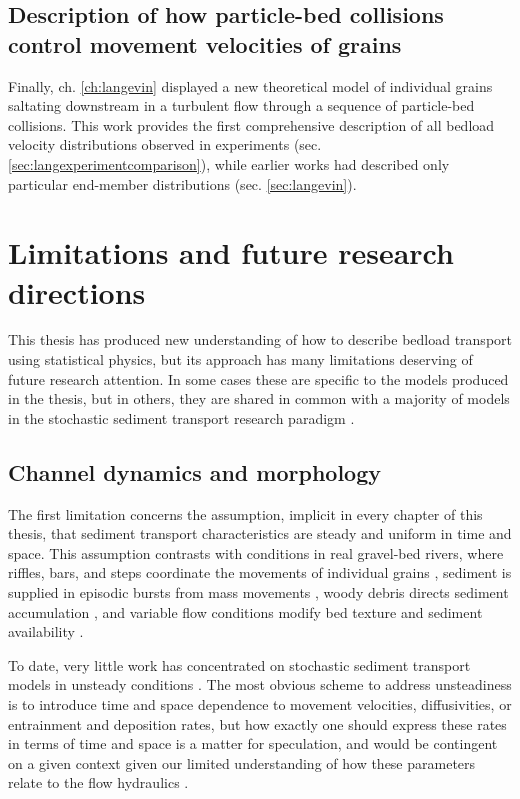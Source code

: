 \subsection{Description of how particle-bed collisions control movement velocities of grains}

Finally, ch. \ref{ch:langevin} displayed a new theoretical model of individual grains saltating downstream in a turbulent flow through a sequence of particle-bed collisions.
This work provides the first comprehensive description of all bedload velocity distributions observed in experiments (sec. \ref{sec:langexperimentcomparison}), while earlier works had described only particular end-member distributions (sec. \ref{sec:langevin}).

\section{Limitations and future research directions}

This thesis has produced new understanding of how to describe bedload transport using statistical physics, but its approach has many limitations deserving of future research attention.
In some cases these are specific to the models produced in the thesis, but in others, they are shared in common with a majority of models in the stochastic sediment transport research paradigm \citep{Ancey2020,Furbish2021a}.

\subsection{Channel dynamics and morphology}

The first limitation concerns the assumption, implicit in every chapter of this thesis, that sediment transport characteristics are steady and uniform in time and space.
This assumption contrasts with conditions in real gravel-bed rivers, where riffles, bars, and steps coordinate the movements of individual grains \citep{Ashmore1998,McDowell2020}, sediment is supplied in episodic bursts from mass movements \citep{Benda1990, Muller2018}, woody debris directs sediment accumulation \citep{Eaton2012,Reid2019}, and variable flow conditions modify bed texture and sediment availability \citep{Mao2012,Phillips2018}.

To date, very little work has concentrated on stochastic sediment transport models in unsteady conditions \citep[e.g.][]{Bohorquez2016}.
The most obvious scheme to address unsteadiness is to introduce time and space dependence to movement velocities, diffusivities, or entrainment and deposition rates, but how exactly one should express these rates in terms of time and space is a matter for speculation, and would be contingent on a given context given our limited understanding of how these parameters relate to the flow hydraulics \citep[e.g.][]{Heyman2016}.


